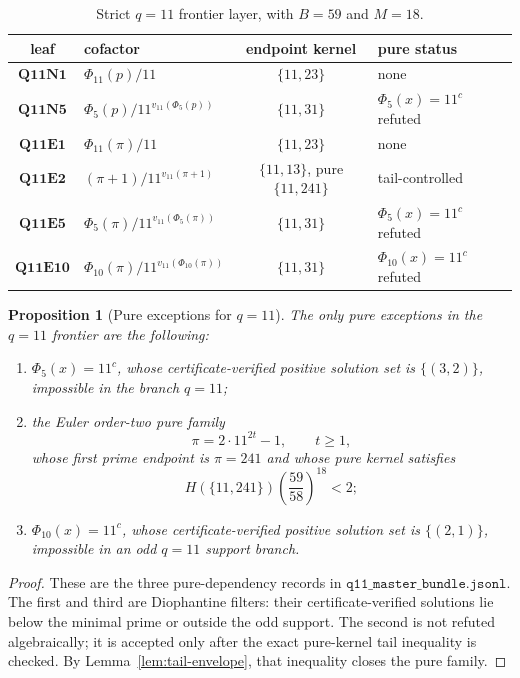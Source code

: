 \documentclass[11pt]{article}
\newtheorem{proposition}[theorem]{Proposition}
\theoremstyle{definition}
\theoremstyle{remark}
\newcommand{\Hfun}{H}
\begin{document}
\begin{table}[ht]
\centering
\small
\begin{tabularx}{\textwidth}{c|>{\raggedright\arraybackslash}X|c|>{\raggedright\arraybackslash}p{}}
\toprule
leaf & cofactor & endpoint kernel & pure status\\
\midrule
\(\mathbf{Q11N1}\) & \(\Phi_{11}(p)/11\) & \(\{11,23\}\) & none\\
\(\mathbf{Q11N5}\) & \(\Phi_5(p)/11^{v_{11}(\Phi_5(p))}\) & \(\{11,31\}\) & \(\Phi_5(x)=11^c\) refuted\\
\(\mathbf{Q11E1}\) & \(\Phi_{11}(\pi)/11\) & \(\{11,23\}\) & none\\
\(\mathbf{Q11E2}\) & \((\pi+1)/11^{v_{11}(\pi+1)}\) & \(\{11,13\}\), pure \(\{11,241\}\) & tail-controlled\\
\(\mathbf{Q11E5}\) & \(\Phi_5(\pi)/11^{v_{11}(\Phi_5(\pi))}\) & \(\{11,31\}\) & \(\Phi_5(x)=11^c\) refuted\\
\(\mathbf{Q11E10}\) & \(\Phi_{10}(\pi)/11^{v_{11}(\Phi_{10}(\pi))}\) & \(\{11,31\}\) & \(\Phi_{10}(x)=11^c\) refuted\\
\bottomrule
\end{tabularx}
\caption{Strict \(q=11\) frontier layer, with \(B=59\) and \(M=18\).}
\label{tab:q11-frontier}
\end{table}
\FloatBarrier

\begin{proposition}[Pure exceptions for \(q=11\)]
\label{prop:q11-pure}
The only pure exceptions in the \(q=11\) frontier are the following:
\begin{enumerate}[label=(\roman*),leftmargin=2.2em]
\item \(\Phi_5(x)=11^c\), whose certificate-verified positive solution set is
\(\{(3,2)\}\), impossible in the branch \(q=11\);
\item the Euler order-two pure family
\[
  \pi=2\cdot 11^{2t}-1,\qquad t\ge1,
\]
whose first prime endpoint is \(\pi=241\) and whose pure kernel satisfies
\[
  \Hfun(\{11,241\})\left(\frac{59}{58}\right)^{18}<2;
\]
\item \(\Phi_{10}(x)=11^c\), whose certificate-verified positive solution set is
\(\{(2,1)\}\), impossible in an odd \(q=11\) support branch.
\end{enumerate}
\end{proposition}

\begin{proof}
These are the three pure-dependency records in
\(\texttt{q11\_master\_bundle.jsonl}\).  The first and third are Diophantine
filters: their certificate-verified solutions lie below the minimal prime or outside the
odd support.  The second is not refuted algebraically; it is accepted only
after the exact pure-kernel tail inequality is checked.  By
Lemma~\ref{lem:tail-envelope}, that inequality closes the pure family.
\end{proof}
\end{document}
